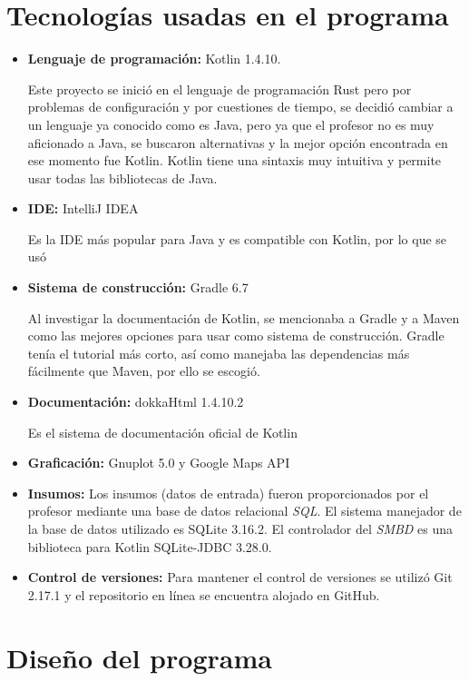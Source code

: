 \documentclass{article}
\begin{document}
\section{Tecnologías usadas en el programa}
\begin{itemize}
	\item{ \textbf{Lenguaje de programación:} Kotlin 1.4.10. 
		
	Este proyecto se inició en el lenguaje de programación Rust pero por problemas de configuración y por cuestiones de tiempo, se decidió cambiar a un lenguaje ya conocido como es Java, pero ya que el profesor no es muy aficionado a Java, se buscaron alternativas y la mejor opción encontrada en ese momento fue Kotlin. Kotlin tiene una sintaxis muy intuitiva y permite usar todas las bibliotecas de Java.}
	\item {\textbf{IDE:} IntelliJ IDEA
		
	Es la IDE más popular para Java y es compatible con Kotlin, por lo que se usó}
	\item {\textbf{Sistema de construcción:} Gradle 6.7
		
	Al investigar la documentación de Kotlin, se mencionaba a Gradle y a Maven como las mejores opciones para usar como sistema de construcción. Gradle tenía el tutorial más corto, así como manejaba las dependencias más fácilmente que Maven, por ello se escogió.
	}
	\item {\textbf{Documentación:} dokkaHtml 1.4.10.2  
	
	Es el sistema de documentación oficial de Kotlin}
	\item {\textbf{Graficación:} Gnuplot 5.0 y Google Maps API}
	\item {\textbf{Insumos:} Los insumos (datos de entrada) fueron proporcionados por el profesor mediante una base de datos relacional \textit{SQL}. El sistema manejador de la base de datos utilizado es SQLite 3.16.2. El controlador del \textit{SMBD} es una biblioteca para Kotlin SQLite-JDBC 3.28.0.}
	\item {\textbf{Control de versiones:} Para mantener el control de versiones se utilizó Git 2.17.1 y el repositorio en línea se encuentra alojado en GitHub.}
\end{itemize}

\section{Diseño del programa}
\end{document}
